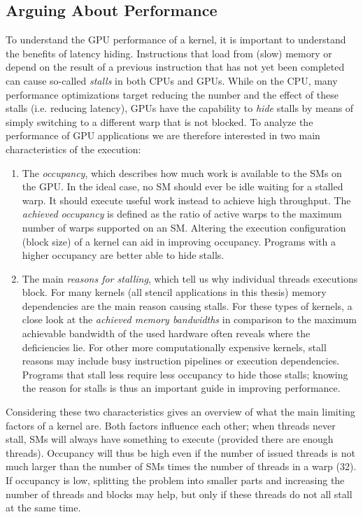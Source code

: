 \subsection{Arguing About Performance}
\label{sec:arguing}

To understand the GPU performance of a kernel, it is important to understand the benefits of latency hiding. Instructions that load from (slow) memory or depend on the result of a previous instruction that has not yet been completed can cause so-called \emph{stalls} in both CPUs and GPUs. While on the CPU, many performance optimizations target reducing the number and the effect of these stalls (i.e. reducing latency), GPUs have the capability to \emph{hide} stalls by means of simply switching to a different warp that is not blocked. To analyze the performance of GPU applications we are therefore interested in two main characteristics of the execution:

\begin{enumerate}
    \item The \emph{occupancy}, which describes how much work is available to the SMs on the GPU. In the ideal case, no SM should ever be idle waiting for a stalled warp. It should execute useful work instead to achieve high throughput. The \emph{achieved occupancy} is defined as the ratio of active warps to the maximum number of warps supported on an SM. Altering the execution configuration (block size) of a kernel can aid in improving occupancy. Programs with a higher occupancy are better able to hide stalls.
    \item The main \emph{reasons for stalling}, which tell us why individual threads executions block. For many kernels (all stencil applications in this thesis) memory dependencies are the main reason causing stalls. For these types of kernels, a close look at the \emph{achieved memory bandwidths} in comparison to the maximum achievable bandwidth of the used hardware often reveals where the deficiencies lie. For other more computationally expensive kernels, stall reasons may include busy instruction pipelines or execution dependencies. Programs that stall less require less occupancy to hide those stalls; knowing the reason for stalls is thus an important guide in improving performance.
\end{enumerate}

Considering these two characteristics gives an overview of what the main limiting factors of a kernel are. Both factors influence each other; when threads never stall, SMs will always have something to execute (provided there are enough threads). Occupancy will thus be high even if the number of issued threads is not much larger than the number of SMs times the number of threads in a warp (32). If occupancy is low, splitting the problem into smaller parts and increasing the number of threads and blocks may help, but only if these threads do not all stall at the same time.

